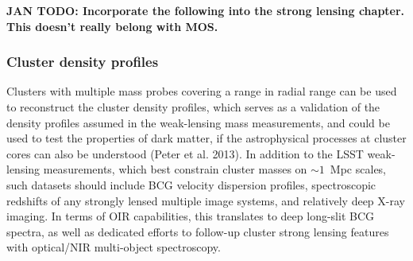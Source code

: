 



{\bf  JAN TODO: Incorporate the following into the strong lensing chapter.  This doesn't really belong with MOS.}
\subsubsection{Cluster density profiles}

Clusters with multiple mass probes covering a range in radial range can be used to reconstruct the cluster density profiles, which serves as a validation of the density profiles assumed in the weak-lensing mass measurements, and could be used to test the properties of dark matter, if the astrophysical processes at cluster cores can also be understood (Peter et al. 2013).  In addition to the LSST weak-lensing measurements, which best constrain cluster masses on $\sim1$~Mpc scales, such datasets should include BCG velocity dispersion profiles, spectroscopic redshifts of any strongly lensed multiple image systems, and relatively deep X-ray imaging. In terms of OIR capabilities, this translates to deep long-slit BCG spectra, as well as dedicated efforts to follow-up cluster strong lensing features with optical/NIR multi-object spectroscopy.  %

